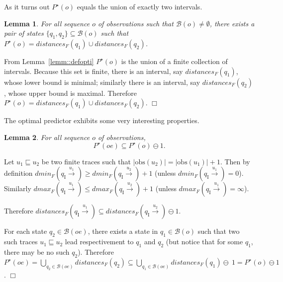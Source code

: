 \documentclass{article}
\newtheorem{lemm}{Lemma}
\newenvironment{proof}{\par\noindent{\bf Proof}}{\hspace{\stretch{1}}$\Box$}
\newcommand{\prefix}{\sqsubseteq}
\newcommand{\qi}[0]{q_{\mathrm{I}}}
\newcommand{\trans}[1]{\stackrel{#1}{\rightarrow}}
\newcommand{\obs}[0]{\mathrm{obs}}
\newcommand{\dmin}[1]{\mathit{dmin}_{#1}}
\newcommand{\dmax}[1]{\mathit{dmax}_{#1}}
\newcommand{\distances}{\mathit{distances}_F}
\newcommand{\belief}{\mathcal{B}}
\newcommand{\optimal}[1]{{#1}^\star}
\newcommand{\optipred}{\optimal{P}}
\newcommand{\set}[1]{\{#1\}}
\begin{document}
As it turns out $\optipred(o)$ equals the union of exactly two intervals.  

\begin{lemm}\label{lemm::twostates}
  For all sequence $o$ of observations 
  such that $\belief(o) \neq \emptyset$, 
  there exists a pair of states $\set{q_1,q_2} \subseteq \belief(o)$ 
  such that $\optipred(o) = \distances(q_1) \cup \distances(q_2)$.  
\end{lemm}

\begin{proof}
  From Lemma~\ref{lemm::defopti} 
  $\optipred(o)$ is the union of a finite collection of intervals.  
  Because this set is finite, there is an interval, say $\distances(q_1)$, 
  whose lower bound is minimal; 
  similarly there is an interval, say $\distances(q_2)$, 
  whose upper bound is maximal.  
  Therefore $\optipred(o) = \distances(q_1) \cup \distances(q_2)$.  
\end{proof}

The optimal predictor exhibits some very interesting properties.  

\begin{lemm}\label{lemm::onemoreobs}
  For all sequence $o$ of observations, 
  \begin{displaymath}
    \optipred(oe) \subseteq \optipred(o) \ominus 1.  
  \end{displaymath}
\end{lemm}

\begin{proof}
  Let $u_1 \prefix u_2$ be two finite traces 
  such that $|\obs(u_2)| = |\obs(u_1)| + 1$.  
  Then by definition 
  $\dmin{F}(\qi \trans{u_1}) \ge \dmin{F}(\qi \trans{u_2}) + 1$ 
  (unless $\dmin{F}(\qi \trans{u_1}) = 0$).  
  Similarly 
  $\dmax{F}(\qi \trans{u_1}) \le \dmax{F}(\qi \trans{u_2}) + 1$ 
  (unless $\dmax{F}(\qi \trans{u_1}) = \infty$).  
  
  Therefore $\distances(\qi \trans{u_1}) 
  \subseteq \distances(\qi \trans{u_2}) \ominus 1$.  

  For each state $q_2 \in \belief(oe)$, 
  there exists a state in $q_1 \in \belief(o)$ 
  such that two such traces $u_1 \prefix u_2$ 
  lead respectivement to $q_1$ and $q_2$ 
  (but notice that for some $q_1$, there may be no such $q_2$).  
  Therefore $\optipred(oe) = \bigcup_{q_2 \in \belief(oe)} \distances(q_2) 
  \subseteq \bigcup_{q_1 \in \belief(oe)} \distances(q_1) \ominus~1
  = \optipred(o) \ominus 1$.  
\end{proof}
\end{document}
